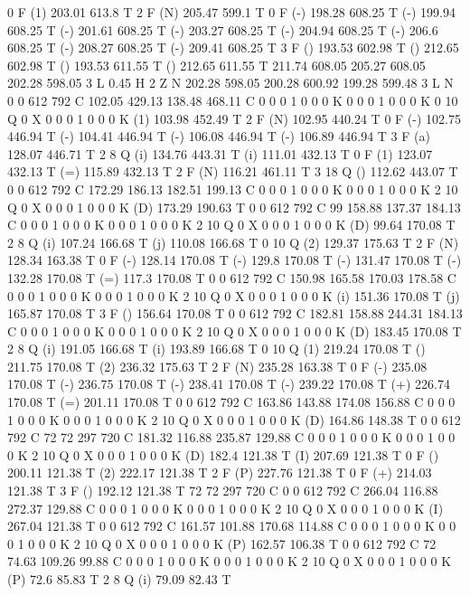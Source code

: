 0 F
(1) 203.01 613.8 T
2 F
(N) 205.47 599.1 T
0 F
(-) 198.28 608.25 T
(-) 199.94 608.25 T
(-) 201.61 608.25 T
(-) 203.27 608.25 T
(-) 204.94 608.25 T
(-) 206.6 608.25 T
(-) 208.27 608.25 T
(-) 209.41 608.25 T
3 F
() 193.53 602.98 T
() 212.65 602.98 T
() 193.53 611.55 T
() 212.65 611.55 T
211.74 608.05 205.27 608.05 202.28 598.05 3 L
0.45 H
2 Z
N
202.28 598.05 200.28 600.92 199.28 599.48 3 L
N
0 0 612 792 C
102.05 429.13 138.48 468.11 C
0 0 0 1 0 0 0 K
0 0 0 1 0 0 0 K
0 10 Q
0 X
0 0 0 1 0 0 0 K
(1) 103.98 452.49 T
2 F
(N) 102.95 440.24 T
0 F
(-) 102.75 446.94 T
(-) 104.41 446.94 T
(-) 106.08 446.94 T
(-) 106.89 446.94 T
3 F
(a) 128.07 446.71 T
2 8 Q
(i) 134.76 443.31 T
(i) 111.01 432.13 T
0 F
(1) 123.07 432.13 T
(=) 115.89 432.13 T
2 F
(N) 116.21 461.11 T
3 18 Q
() 112.62 443.07 T
0 0 612 792 C
172.29 186.13 182.51 199.13 C
0 0 0 1 0 0 0 K
0 0 0 1 0 0 0 K
2 10 Q
0 X
0 0 0 1 0 0 0 K
(D) 173.29 190.63 T
0 0 612 792 C
99 158.88 137.37 184.13 C
0 0 0 1 0 0 0 K
0 0 0 1 0 0 0 K
2 10 Q
0 X
0 0 0 1 0 0 0 K
(D) 99.64 170.08 T
2 8 Q
(i) 107.24 166.68 T
(j) 110.08 166.68 T
0 10 Q
(2) 129.37 175.63 T
2 F
(N) 128.34 163.38 T
0 F
(-) 128.14 170.08 T
(-) 129.8 170.08 T
(-) 131.47 170.08 T
(-) 132.28 170.08 T
(=) 117.3 170.08 T
0 0 612 792 C
150.98 165.58 170.03 178.58 C
0 0 0 1 0 0 0 K
0 0 0 1 0 0 0 K
2 10 Q
0 X
0 0 0 1 0 0 0 K
(i) 151.36 170.08 T
(j) 165.87 170.08 T
3 F
() 156.64 170.08 T
0 0 612 792 C
182.81 158.88 244.31 184.13 C
0 0 0 1 0 0 0 K
0 0 0 1 0 0 0 K
2 10 Q
0 X
0 0 0 1 0 0 0 K
(D) 183.45 170.08 T
2 8 Q
(i) 191.05 166.68 T
(i) 193.89 166.68 T
0 10 Q
(1) 219.24 170.08 T
() 211.75 170.08 T
(2) 236.32 175.63 T
2 F
(N) 235.28 163.38 T
0 F
(-) 235.08 170.08 T
(-) 236.75 170.08 T
(-) 238.41 170.08 T
(-) 239.22 170.08 T
(+) 226.74 170.08 T
(=) 201.11 170.08 T
0 0 612 792 C
163.86 143.88 174.08 156.88 C
0 0 0 1 0 0 0 K
0 0 0 1 0 0 0 K
2 10 Q
0 X
0 0 0 1 0 0 0 K
(D) 164.86 148.38 T
0 0 612 792 C
72 72 297 720 C
181.32 116.88 235.87 129.88 C
0 0 0 1 0 0 0 K
0 0 0 1 0 0 0 K
2 10 Q
0 X
0 0 0 1 0 0 0 K
(D) 182.4 121.38 T
(I) 207.69 121.38 T
0 F
() 200.11 121.38 T
(2) 222.17 121.38 T
2 F
(P) 227.76 121.38 T
0 F
(+) 214.03 121.38 T
3 F
() 192.12 121.38 T
72 72 297 720 C
0 0 612 792 C
266.04 116.88 272.37 129.88 C
0 0 0 1 0 0 0 K
0 0 0 1 0 0 0 K
2 10 Q
0 X
0 0 0 1 0 0 0 K
(I) 267.04 121.38 T
0 0 612 792 C
161.57 101.88 170.68 114.88 C
0 0 0 1 0 0 0 K
0 0 0 1 0 0 0 K
2 10 Q
0 X
0 0 0 1 0 0 0 K
(P) 162.57 106.38 T
0 0 612 792 C
72 74.63 109.26 99.88 C
0 0 0 1 0 0 0 K
0 0 0 1 0 0 0 K
2 10 Q
0 X
0 0 0 1 0 0 0 K
(P) 72.6 85.83 T
2 8 Q
(i) 79.09 82.43 T
